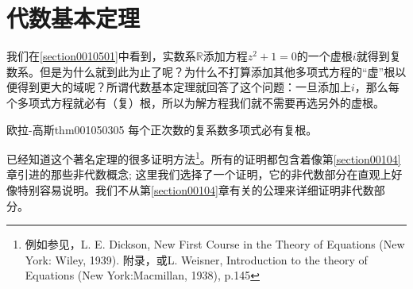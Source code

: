 \section{代数基本定理}\label{section0010503}
我们在\ref{section0010501}中看到，实数系$\mathbb{R}$添加方程$z^2+1=0$的一个虚根$i$就得到复数系。但是为什么就到此为止了呢？为什么不打算添加其他多项式方程的“虚”根以便得到更大的域呢？所谓代数基本定理就回答了这个问题：一旦添加上$i$，那么每个多项式方程就必有（复）根，所以为解方程我们就不需要再选另外的虚根。

\begin{theorem}{欧拉-高斯}{thm001050305}
每个正次数的复系数多项式必有复根。
\end{theorem}

已经知道这个著名定理的很多证明方法\footnote{例如参见，L. E. Dickson, New First Course in the Theory of Equations (New York: Wiley, 1939). 附录，或L. Weisner, Introduction to the theory of Equations (New York:Macmillan, 1938), p.145}。所有的证明都包含着像第\ref{section00104}章引进的那些非代数概念; 这里我们选择了一个证明，它的非代数部分在直观上好像特别容易说明。我们不从第\ref{section00104}章有关的公理来详细证明非代数部分。

